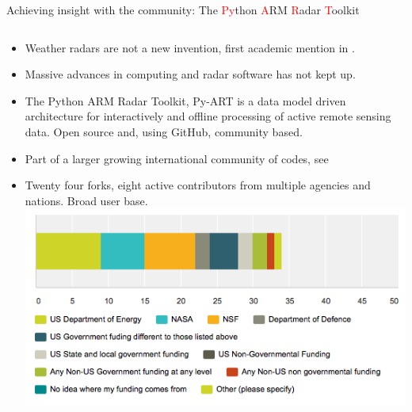 \documentclass[final]{beamer}
\begin{document}
\begin{frame}{}
\begin{columns}[t]
\begin{column}{.3\linewidth}
         
        \begin{block}{Achieving insight with the community: The \textcolor{red}{Py}thon \textcolor{red}{A}RM \textcolor{red}{R}adar \textcolor{red}{T}oolkit}
                \begin{columns}[t]
                    \begin{column}{.55\linewidth}
                        \begin{itemize}
                            \item Weather radars are not a new invention, first academic mention in \citet{bent_radar_1943}.
                            \item Massive advances in computing and radar software has not kept up.
                            \item The Python ARM Radar Toolkit, Py-ART  is a data model driven architecture for interactively and 
                            offline processing of active remote sensing data. Open source and, using GitHub, community based.
                            \item Part of a larger growing international community of codes, see \citet{heistermann_emergence_2014}
                            \item Twenty four forks, eight active contributors from multiple agencies and nations. Broad user base. 
                             \includegraphics[width=0.8\linewidth]{figures/survey}\\[1ex]                        
                       \end{itemize}
                   \end{column}
\end{columns}
\end{block}
\end{column}
\end{columns}
\end{frame}
\end{document}
